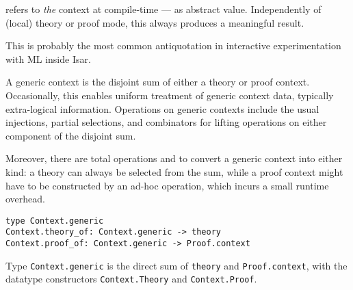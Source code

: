 \begin{isabellebody}
\begin{isamarkuptext}
  \begin{description}

  \item {} refers to \emph{the} context at
  compile-time --- as abstract value.  Independently of (local) theory
  or proof mode, this always produces a meaningful result.

  This is probably the most common antiquotation in interactive
  experimentation with ML inside Isar.

  \end{description}%
\end{isamarkuptext}%
\isamarkuptrue%
%
\endisatagmlantiq
{\isafoldmlantiq}%
%
\isadelimmlantiq
%
\endisadelimmlantiq
%
\isamarkuptrue%
%
\begin{isamarkuptext}%
A generic context is the disjoint sum of either a theory or proof
  context.  Occasionally, this enables uniform treatment of generic
  context data, typically extra-logical information.  Operations on
  generic contexts include the usual injections, partial selections,
  and combinators for lifting operations on either component of the
  disjoint sum.

  Moreover, there are total operations  and  to convert a generic context into either kind: a theory
  can always be selected from the sum, while a proof context might
  have to be constructed by an ad-hoc  operation, which
  incurs a small runtime overhead.%
\end{isamarkuptext}%
\isamarkuptrue%
%
\isadelimmlref
%
\endisadelimmlref
%
\isatagmlref
%
\begin{isamarkuptext}%
\begin{mldecls}
  \verb|type Context.generic| \\
  \verb|Context.theory_of: Context.generic -> theory| \\
  \verb|Context.proof_of: Context.generic -> Proof.context| \\
  \end{mldecls}

  \begin{description}

  \item Type \verb|Context.generic| is the direct sum of \verb|theory| and \verb|Proof.context|, with the datatype
  constructors \verb|Context.Theory| and \verb|Context.Proof|.


\end{description}
\end{isamarkuptext}
\end{isabellebody}
